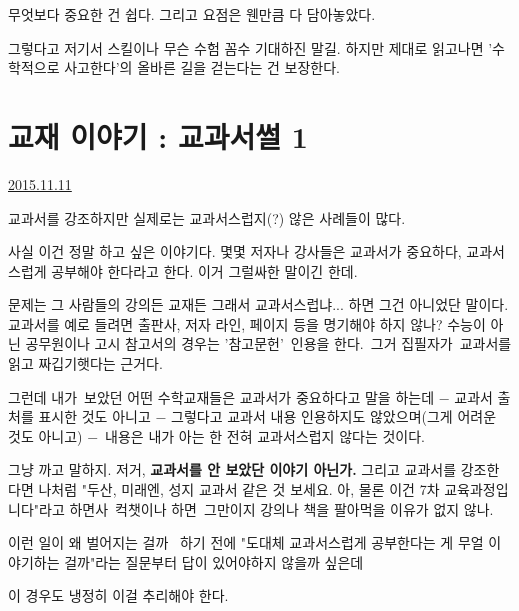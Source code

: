 무엇보다 중요한 건 쉽다. 그리고 요점은 웬만큼 다 담아놓았다.
\vspace{5mm}

그렇다고 저기서 스킬이나 무슨 수험 꼼수 기대하진 말길.
하지만 제대로 읽고나면 '수학적으로 사고한다'의 올바른 길을 걷는다는 건 보장한다.
\vspace{5mm}







\section{교재 이야기 : 교과서썰 1}
\href{https://www.kockoc.com/Apoc/476332}{2015.11.11}

\vspace{5mm}

교과서를 강조하지만 실제로는 교과서스럽지(?) 않은 사례들이 많다.
\vspace{5mm}

사실 이건 정말 하고 싶은 이야기다.
몇몇 저자나 강사들은 교과서가 중요하다, 교과서스럽게 공부해야 한다라고 한다.
이거 그럴싸한 말이긴 한데.
\vspace{5mm}

문제는 그 사람들의 강의든 교재든 그래서 교과서스럽냐... 하면 그건 아니었단 말이다.
교과서를 예로 들려면 출판사, 저자 라인, 페이지 등을 명기해야 하지 않나?
수능이 아닌 공무원이나 고시 참고서의 경우는 '참고문헌' 인용을 한다. 그거 집필자가 교과서를 읽고 짜깁기햇다는 근거다.
\vspace{5mm}

그런데 내가 보았던 어떤 수학교재들은 교과서가 중요하다고 말을 하는데
$-$ 교과서 출처를 표시한 것도 아니고
$-$ 그렇다고 교과서 내용 인용하지도 않았으며(그게 어려운 것도 아니고)
$-$ 내용은 내가 아는 한 전혀 교과서스럽지 않다는 것이다.
\vspace{5mm}

그냥 까고 말하지. 저거, \textbf{교과서를 안 보았단 이야기 아닌가.}
그리고 교과서를 강조한다면 나처럼 "두산, 미래엔, 성지 교과서 같은 것 보세요. 아, 물론 이건 7차 교육과정입니다"라고 하면사 컥챗이나 하면 그만이지
강의나 책을 팔아먹을 이유가 없지 않나.
\vspace{5mm}

이런 일이 왜 벌어지는 걸까  하기 전에
"도대체 교과서스럽게 공부한다는 게 무얼 이야기하는 걸까"라는 질문부터 답이 있어야하지 않을까 싶은데
\vspace{5mm}

이 경우도 냉정히 이걸 추리해야 한다.
\vspace{5mm}


